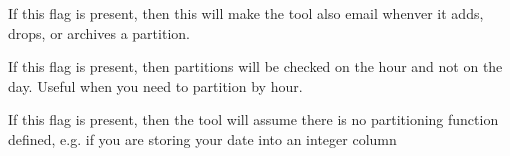 \documentclass[letterpaper,10pt,english]{sphinxmanual}
\begin{document}
\begin{fulllineitems}
\label{\detokenize{mariadb-parted:cmdoption-mariadb-parted-email-activity}}
If this flag is present, then this will make the tool also email
whenver it adds, drops, or archives a partition.

\end{fulllineitems}


\begin{fulllineitems}
\label{\detokenize{mariadb-parted:cmdoption-mariadb-parted-use-hours}}
If this flag is present, then partitions will be checked on the hour and not on the day.
Useful when you need to partition by hour.

\end{fulllineitems}


\begin{fulllineitems}
\label{\detokenize{mariadb-parted:cmdoption-mariadb-parted-partcol-integer}}
If this flag is present, then the tool will assume there is no partitioning function
defined, e.g. if you are storing your date into an integer column

\end{fulllineitems}
\end{document}
